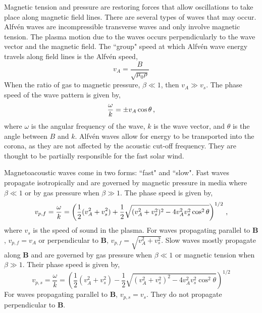 Magnetic tension and pressure are restoring forces that allow oscillations to take place along magnetic field lines. There are several types of waves that may occur.
Alfv\'en waves are incompressible transverse waves and only involve magnetic tension. The plasma motion due to the waves occurs perpendicularly to the wave vector and the magnetic field. The ``group" speed at which Alfv\'en wave energy travels along field lines is the Alfv\'en speed,
\begin{equation}
v_A = \frac{B}{\sqrt{\mu_0 \rho}} 
\end{equation}
When the ratio of gas to magnetic pressure, $\beta \ll 1$, then $v_A \gg v_s$. 
The phase speed of the wave pattern is given by,
\begin{equation}
\frac{\omega}{k} = \pm v_A \cos \theta \mbox{\,,}
\end{equation}
where $\omega$ is the angular frequency of the wave, $k$ is the wave vector, and $\theta$ is the angle between $B$ and $k$.
Alfv\'en waves allow for energy to be transported into the corona, as they are not affected by the acoustic cut-off frequency. They are thought to be partially responsible for the fast solar wind.

Magnetoacoustic waves come in two forms: ``fast" and ``slow". Fast waves propagate isotropically and are governed by magnetic pressure in media where $\beta \ll 1$ or by gas pressure when $\beta \gg 1$. The phase speed is given by,
\begin{equation}
v_{p,f} = \frac{\omega}{k} = \left( \frac{1}{2} (v_A^2 + v_s^2) + \frac{1}{2}\sqrt{(v_A^2+v_s^2)^2 - 4 v_A^2 v_s^2 \cos^2 \theta} \right)^{1/2} \mbox{\,,}
\end{equation}
where $v_s$ is the speed of sound in the plasma. For waves propagating parallel to $\mathbf{B}$, $v_{p,f}=v_A$ or perpendicular to $\mathbf{B}$, $v_{p,f}=\sqrt{v_A^2+v_s^2}$.
Slow waves mostly propagate along $\mathbf{B}$ and are governed by gas pressure when $\beta \ll 1$ or magnetic tension when $\beta \gg 1$. Their phase speed is given by,
\begin{equation}
v_{p,s} = \frac{\omega}{k} = \left( \frac{1}{2} (v_A^2 + v_s^2) - \frac{1}{2}\sqrt{(v_A^2+v_s^2)^2 - 4 v_A^2 v_s^2 \cos^2 \theta} \right)^{1/2}
\end{equation}
For waves propagating parallel to $\mathbf{B}$, $v_{p,s}=v_s$. They do not propagate perpendicular to $\mathbf{B}$.

